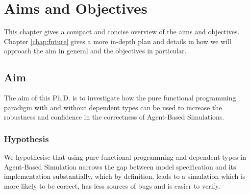 \chapter{Aims and Objectives}
\label{chap:aimsObj}

This chapter gives a compact and concise overview of the aims and objectives. Chapter \ref{chap:future} gives a more in-depth plan and details in how we will approach the aim in general and the objectives in particular.

\section{Aim}
The aim of this Ph.D. is to investigate how the pure functional programming paradigm with and without dependent types can be used to increase the robustness and confidence in the correctness of Agent-Based Simulations.

\subsection{Hypothesis}
We hypothesise that using pure functional programming and dependent types in Agent-Based Simulation narrows the gap between model specification and its implementation substantially, which by definition, leads to a simulation which is more likely to be correct, has less sources of bugs and is easier to verify. %

